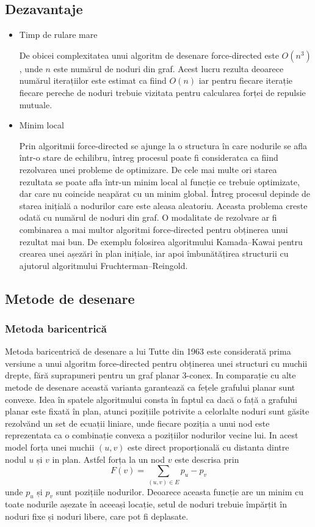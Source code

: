 \subsection{Dezavantaje}

\begin{itemize}
\item Timp de rulare mare

De obicei complexitatea unui algoritm de desenare force-directed este \(O(n^3)\), unde \(n\) este numărul de noduri din graf. 
Acest lucru rezulta deoarece numărul iterațiilor este estimat ca fiind \(O(n)\) iar pentru fiecare iterație fiecare 
pereche de noduri trebuie vizitata pentru calcularea forței de repulsie mutuale.

\item Minim local

Prin algoritmii force-directed se ajunge la o structura în care nodurile se afla într-o stare de echilibru, întreg procesul poate 
fi consideratca ca fiind rezolvarea unei probleme de optimizare.
De cele mai multe ori starea rezultata se poate afla într-un minim local al funcție ce trebuie optimizate, dar care nu 
coincide neapărat cu un minim global. Întreg procesul depinde de starea inițială a nodurilor care este aleasa aleatoriu. 
Aceasta problema creste odată cu numărul de noduri din graf. O modalitate de rezolvare ar fi combinarea a mai multor 
algoritmi force-directed pentru obținerea unui rezultat mai bun. De exemplu folosirea algoritmului Kamada–Kawai pentru 
crearea unei așezări în plan inițiale, iar apoi îmbunătățirea structurii cu ajutorul algoritmului Fruchterman–Reingold.

\end{itemize}

\subsection{Metode de desenare}
\subsubsection{Metoda baricentrică}
Metoda baricentrică de desenare a lui Tutte din 1963 este considerată prima versiune a unui algoritm force-directed 
pentru obținerea unei structuri cu muchii drepte, fără suprapuneri pentru un graf planar 3-conex. In comparație cu alte 
metode de desenare această varianta garantează ca fețele grafului planar sunt convexe. Idea în spatele algoritmului 
consta în faptul ca dacă o față a grafului planar este fixată în plan, atunci pozițiile potrivite a celorlalte noduri sunt 
găsite rezolvănd un set de ecuații liniare, unde fiecare poziția a unui nod este reprezentata ca o combinație convexa a 
pozițiilor nodurilor vecine lui. In acest model forța unei muchii \((u,v)\) este direct proporțională cu distanta dintre 
nodul \(u\) și \(v\) in plan. Astfel forța la un nod \(v\) este descrisa prin 
\[F(v)=\sum_{(u,v) \in E} p_u-p_v\] 
unde \(p_u\) și \(p_v\) sunt pozițiile nodurilor. Deoarece aceasta funcție are un minim cu toate nodurile așezate în aceeași locație, setul 
de noduri trebuie împărțit în noduri fixe și noduri libere, care pot fi deplasate.

